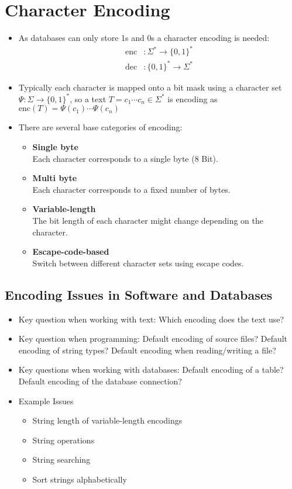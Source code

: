 	\section{Character Encoding} %
		\begin{itemize}
			\item As databases can only store 1s and 0s a character encoding is needed:
				\begin{align*}
					\text{enc} & : \Sigma^* \rightarrow \{ 0, 1 \}^* \tag{Encoding} \\
					\text{dec} & : \{ 0, 1 \}^* \rightarrow \Sigma^* \tag{Decoding}
				\end{align*}
			\item Typically each character is mapped onto a bit mask using a character set \( \Psi : \Sigma \rightarrow \{ 0, 1 \}^* \), so a text \( T = c_1 \cdots c_n \in \Sigma^* \) is encoding as \( \text{enc}(T) = \Psi(c_1)\cdots\Psi(c_n) \)
			\item There are several base categories of encoding:
				\begin{itemize}
					\item \textbf{Single byte} \\ Each character corresponds to a single byte (8 Bit).
					\item \textbf{Multi byte} \\ Each character corresponds to a fixed number of bytes.
					\item \textbf{Variable-length} \\ The bit length of each character might change depending on the character.
					\item \textbf{Escape-code-based} \\ Switch between different character sets using escape codes.
				\end{itemize}
		\end{itemize}

		\subsection{Encoding Issues in Software and Databases} %
			\begin{itemize}
				\item Key question when working with text: Which encoding does the text use?
				\item Key question when programming: Default encoding of source files? Default encoding of string types? Default encoding when reading/writing a file?
				\item Key questions when working with databases: Default encoding of a table? Default encoding of the database connection?
				\item Example Issues
					\begin{itemize}
						\item String length of variable-length encodings
						\item String operations
						\item String searching
						\item Sort strings alphabetically
					\end{itemize}
			\end{itemize}

